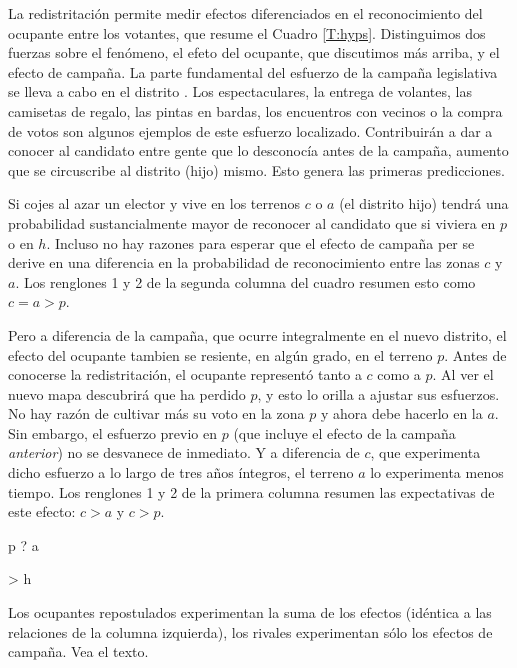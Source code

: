 \documentclass[letter,12pt]{article}
\newcommand{\mc}{\multicolumn}
\begin{document}
La redistritación permite medir efectos diferenciados en el reconocimiento del ocupante entre los votantes, que resume el Cuadro \ref{T:hyps}. Distinguimos dos fuerzas sobre el fenómeno, el efeto del ocupante, que discutimos más arriba, y el efecto de campaña. La parte fundamental del esfuerzo de la campaña legislativa se lleva a cabo en el distrito \citep{langston.nd}. Los espectaculares, la entrega de volantes, las camisetas de regalo, las pintas en bardas, los encuentros con vecinos o la compra de votos son algunos ejemplos de este esfuerzo localizado. Contribuirán a dar a conocer al candidato entre gente que lo desconocía antes de la campaña, aumento que se circuscribe al distrito (hijo) mismo. Esto genera las primeras predicciones.

Si cojes al azar un elector y vive en los terrenos $c$ o $a$ (el distrito hijo) tendrá una probabilidad sustancialmente mayor de reconocer al candidato que si viviera en $p$ o en $h$. Incluso no hay razones para esperar que el efecto de campaña per se derive en una diferencia en la probabilidad de reconocimiento entre las zonas $c$ y $a$. Los renglones 1 y 2 de la segunda columna del cuadro resumen esto como $c=a>p$. 

Pero a diferencia de la campaña, que ocurre integralmente en el nuevo distrito, el efecto del ocupante tambien se resiente, en algún grado, en el terreno $p$. Antes de conocerse la redistritación, el ocupante representó tanto a $c$ como a $p$. Al ver el nuevo mapa descubrirá que ha perdido $p$, y esto lo orilla a ajustar sus esfuerzos. No hay razón de cultivar más su voto en la zona $p$ y ahora debe hacerlo en la $a$. Sin embargo, el esfuerzo previo en $p$ (que incluye el efecto de la campaña \emph{anterior}) no se desvanece de inmediato. Y a diferencia de $c$, que experimenta dicho esfuerzo a lo largo de tres años íntegros, el terreno $a$ lo experimenta menos tiempo. Los renglones 1 y 2 de la primera columna resumen las expectativas de este efecto: $c>a$ y $c>p$. 

p ? a

> h

Los ocupantes repostulados experimentan la suma de los efectos (idéntica a las relaciones de la columna izquierda), los rivales experimentan sólo los efectos de campaña. Vea el texto.



\end{document}
